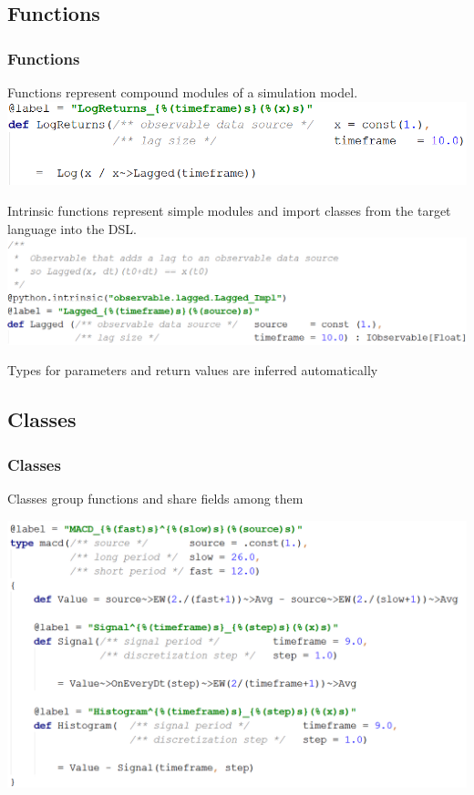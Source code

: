 \documentclass{beamer}
\begin{document}
\subsection{Functions}
\begin{frame}
\frametitle{Functions}
Functions represent compound modules of a simulation model.
\includegraphics[width=1\linewidth]{logreturns.png}

Intrinsic functions represent simple modules and import classes from the target language into the DSL.
\includegraphics[width=1\linewidth]{lagged.png}

Types for parameters and return values are inferred automatically
\end{frame}
\subsection{Classes}
\begin{frame}
\frametitle{Classes}
Classes group functions and share fields among them

\includegraphics[width=1\linewidth]{macd.png}

\end{frame}
\end{document}
